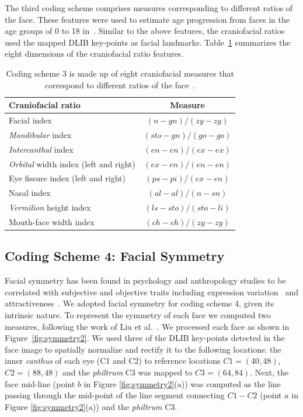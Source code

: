 \documentclass[letterpaper,11pt]{article}
\begin{document}
 The third coding scheme comprises measures corresponding to different ratios of the face. These features were used to estimate age progression from faces in the age groups of 0 to 18 in~\cite{face_age_modeling06}. Similar to the above features, the craniofacial ratios used the mapped DLIB key-points as facial landmarks.  Table~\ref{tab:cranio3} summarizes the eight dimensions of the craniofacial ratio features. 

\begin{table}[ht]
\centering
\begin{tabular}{|l|c|}
    \hline 
   \bf Craniofacial ratio    & \bf Measure\\\hline\hline
    Facial index& $(n-gn)/(zy-zy)$ \\ \hline
    {\it Mandibular} index& $(sto-gn)/(go-go)$\\ \hline
    {\it Intercanthal} index& $(en-en)/(ex-ex)$\\ \hline
    {\it Orbital} width index (left and right)& $(ex-en)/(en-en)$\\ \hline
    Eye fissure index (left and right)& $(ps-pi)/(ex-en)$\\ \hline
    Nasal index& $(al-al)/(n-sn)$\\ \hline
    {\it Vermilion} height index& $(ls-sto)/(sto-li)$\\ \hline
    Mouth-face width index& $(ch-ch)/(zy-zy)$\\ \hline
    \end{tabular}
    \vspace{-0.1cm}
    \caption{Coding scheme 3 is made up of eight craniofacial measures that correspond to different ratios of the face~\cite{anthropmetry05}.}
    \label{tab:cranio3}
\end{table}


\subsection{Coding Scheme 4: Facial Symmetry}

Facial symmetry has been found in  psychology and anthropology studies to be correlated with  subjective and objective traits including expression variation~\cite{symmetryFG02} and attractiveness~\cite{facial_attractiveness11}.  We adopted facial symmetry for coding scheme 4, given its intrinsic nature.  To represent the symmetry of each face we computed two measures, following the work of Liu et al.~\cite{symmetryFG02}.  We processed each face as shown in Figure~\ref{fig:symmetry2}.  We used three of the DLIB key-points detected in the face image to spatially normalize and rectify it to the following locations: the inner {\it canthus} of each eye (C1 and C2) to reference locations $C1=(40,48)$, $C2=(88,48)$ and the {\it philtrum} C3 was mapped to $C3=(64,84)$.  Next, the face mid-line (point $b$ in Figure \ref{fig:symmetry2}(a)) was computed as the line passing through the mid-point of the line segment connecting $C1-C2$ (point $a$ in Figure \ref{fig:symmetry2}(a)) and the {\it philtrum} C3.
\end{document}
